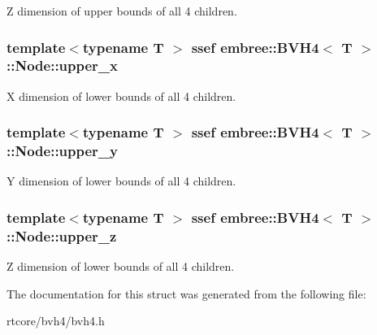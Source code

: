 Z dimension of upper bounds of all 4 children. 

\hypertarget{structembree_1_1_b_v_h4_1_1_node_a327d179144dbd22cb63d6c951e63d54b}{
\subsubsection[{upper\_\-x}]{\setlength{\rightskip}{0pt plus 5cm}template$<$typename T $>$ ssef {\bf embree::BVH4}$<$ T $>$::{\bf Node::upper\_\-x}}}
\label{structembree_1_1_b_v_h4_1_1_node_a327d179144dbd22cb63d6c951e63d54b}


X dimension of lower bounds of all 4 children. 

\hypertarget{structembree_1_1_b_v_h4_1_1_node_ad9a39c79c1e3587abaf7f585d1f66e95}{
\subsubsection[{upper\_\-y}]{\setlength{\rightskip}{0pt plus 5cm}template$<$typename T $>$ ssef {\bf embree::BVH4}$<$ T $>$::{\bf Node::upper\_\-y}}}
\label{structembree_1_1_b_v_h4_1_1_node_ad9a39c79c1e3587abaf7f585d1f66e95}


Y dimension of lower bounds of all 4 children. 

\hypertarget{structembree_1_1_b_v_h4_1_1_node_abcca925fb283b982215882063cc5230f}{
\subsubsection[{upper\_\-z}]{\setlength{\rightskip}{0pt plus 5cm}template$<$typename T $>$ ssef {\bf embree::BVH4}$<$ T $>$::{\bf Node::upper\_\-z}}}
\label{structembree_1_1_b_v_h4_1_1_node_abcca925fb283b982215882063cc5230f}


Z dimension of lower bounds of all 4 children. 



The documentation for this struct was generated from the following file:\begin{DoxyCompactItemize}
\item 
rtcore/bvh4/bvh4.h\end{DoxyCompactItemize}
